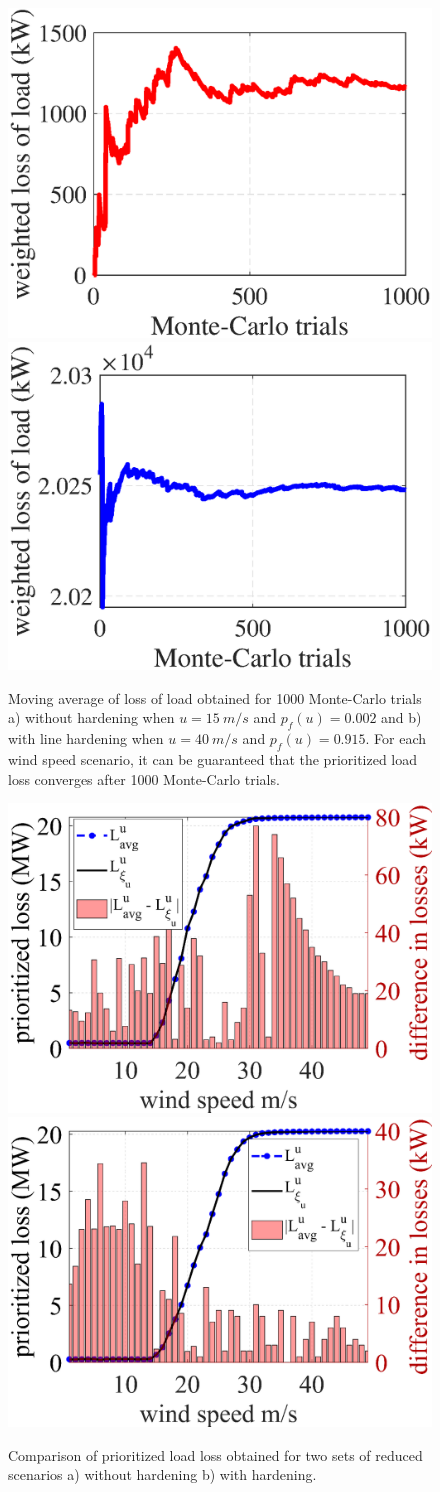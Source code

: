 \begin{figure}[t]
     \centering
     {
        \includegraphics[width=0.42\linewidth]{figures/speed_15_MC_base.eps}
        \label{fig:MCS_1}
    }\hfill
    {
        \includegraphics[width=0.42\linewidth]{figures/speed_40_MC_base.eps}
        \label{fig:MCS_2}
     }
     \caption{Moving average of loss of load obtained for 1000 Monte-Carlo trials a) without hardening when $u = 15~m/s$ and $p_f(u) = 0.002$ and b) with line hardening when $u = 40~m/s$ and $p_f(u) = 0.915$. For each wind speed scenario, it can be guaranteed that the prioritized load loss converges after 1000 Monte-Carlo trials.}
     \label{fig:MCS_convergence}
\end{figure}

\begin{figure}[h]
     \centering
     {
        \includegraphics[width=0.42\linewidth]{figures/scenario_new_load_base.eps}
        \label{fig:scen_set_1}
    }\hfill
    {
        \includegraphics[width=0.42\linewidth]{figures/scenario_new_load_harden.eps}
        \label{fig:scen_set_2}
     }
     \caption{Comparison of prioritized load loss obtained for two sets of reduced scenarios a) without hardening b) with hardening.}
     \label{fig:scenario_reduction}
\end{figure}

